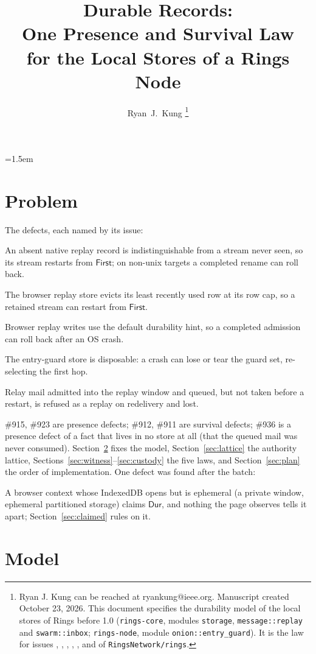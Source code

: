 \documentclass[journal]{IEEEtran}
\author{Ryan~J.~Kung%
\thanks{Ryan J. Kung can be reached at ryankung@ieee.org.
Manuscript created October 23, 2026.  This document specifies the durability model of the
local stores of Rings before 1.0 (\texttt{rings-core}, modules \texttt{storage},
\texttt{message::replay} and \texttt{swarm::inbox}; \texttt{rings-node}, module
\texttt{onion::entry\_guard}).  It is the law for issues \issue{911}, \issue{912},
\issue{915}, \issue{916}, \issue{923}, \issue{936} and \issue{1081} of
\texttt{RingsNetwork/rings}.}}
\title{\huge Durable Records:\\
One Presence and Survival Law\\
for the Local Stores of a Rings Node}
\date{}
\newcommand{\Durable}{\mathsf{Dur}}
\newcommand{\issue}[1]{\#{#1}}
\begin{document}
\maketitle
\emergencystretch=1.5em

\section{Problem}\label{sec:problem}

The defects, each named by its issue:
\begin{description}[leftmargin=1.2em,style=nextline]
\item[\issue{915}] An absent native replay record is indistinguishable from a stream never
seen, so its stream restarts from $\mathsf{First}$; on non-unix targets a completed rename
can roll back.
\item[\issue{923}] The browser replay store evicts its least recently used row at its row
cap, so a retained stream can restart from $\mathsf{First}$.
\item[\issue{912}] Browser replay writes use the default durability hint, so a completed
admission can roll back after an OS crash.
\item[\issue{911}] The entry-guard store is disposable: a crash can lose or tear the guard
set, re-selecting the first hop.
\item[\issue{936}] Relay mail admitted into the replay window and queued, but not taken
before a restart, is refused as a replay on redelivery and lost.
\end{description}
\issue{915}, \issue{923} are presence defects; \issue{912}, \issue{911} are survival defects;
\issue{936} is a presence defect of a fact that lives in no store at all (that the queued mail
was never consumed).  Section~\ref{sec:model} fixes the model, Section~\ref{sec:lattice} the
authority lattice, Sections~\ref{sec:witness}--\ref{sec:custody} the five laws, and
Section~\ref{sec:plan} the order of implementation.  One defect was found after the batch:
\begin{description}[leftmargin=1.2em,style=nextline]
\item[\issue{1036}] A browser context whose IndexedDB opens but is ephemeral (a private
window, ephemeral partitioned storage) claims $\Durable$, and nothing the page observes
tells it apart; Section~\ref{sec:claimed} rules on it.
\end{description}

\section{Model}\label{sec:model}
\end{document}
